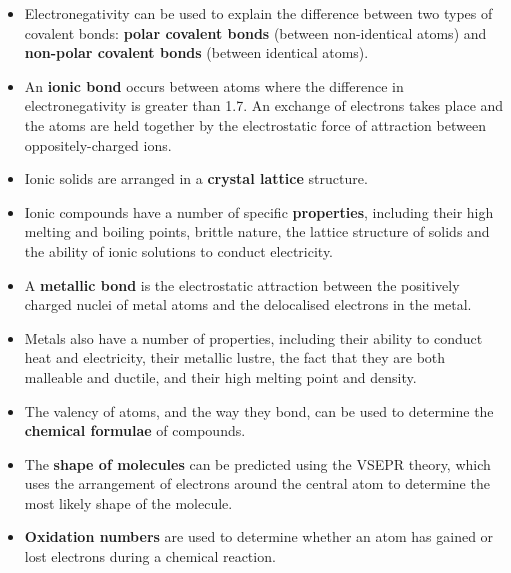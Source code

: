 \begin{itemize}
\item{Electronegativity can be used to explain the difference between two types of covalent bonds: \textbf{polar covalent bonds} (between non-identical atoms) and \textbf{non-polar covalent bonds} (between identical atoms).}
\item{An \textbf{ionic bond} occurs between atoms where the difference in electronegativity is greater than 1.7. An exchange of electrons takes place and the atoms are held together by the electrostatic force of attraction between oppositely-charged ions.}
\item{Ionic solids are arranged in a \textbf{crystal lattice} structure.}
\item{Ionic compounds have a number of specific \textbf{properties}, including their high melting and boiling points, brittle nature, the lattice structure of solids and the ability of ionic solutions to conduct electricity.}
\item{A \textbf{metallic bond} is the electrostatic attraction between the positively charged nuclei of metal atoms and the delocalised electrons in the metal.}
\item{Metals also have a number of properties, including their ability to conduct heat and electricity, their metallic lustre, the fact that they are both malleable and ductile, and their high melting point and density.}
\item{The valency of atoms, and the way they bond, can be used to determine the \textbf{chemical formulae} of compounds.}
\item{The \textbf{shape of molecules} can be predicted using the VSEPR theory, which uses the arrangement of electrons around the central atom to determine the most likely shape of the molecule.}
\item{\textbf{Oxidation numbers} are used to determine whether an atom has gained or lost electrons during a chemical reaction.}
\end{itemize}


